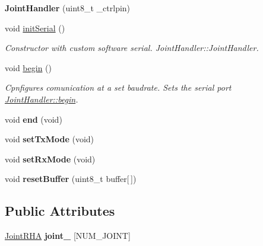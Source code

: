 \begin{DoxyCompactItemize}
\item 
{\bfseries Joint\+Handler} (uint8\+\_\+t \+\_\+ctrlpin)\hypertarget{classJointHandler_a0fee18580cac7d1204d85d8e68b0a9d7}{}\label{classJointHandler_a0fee18580cac7d1204d85d8e68b0a9d7}

\item 
void \hyperlink{classJointHandler_a07ae726dc11e63b114ce75cfb29c512e}{init\+Serial} ()
\begin{DoxyCompactList}\small\item\em Constructor with custom software serial.  Joint\+Handler\+::\+Joint\+Handler. \end{DoxyCompactList}\item 
void \hyperlink{classJointHandler_a7e9040e7d08d4aef28039bf9fa3489fc}{begin} ()
\begin{DoxyCompactList}\small\item\em Cpnfigures comunication at a set baudrate. Sets the serial port  \hyperlink{classJointHandler_a7e9040e7d08d4aef28039bf9fa3489fc}{Joint\+Handler\+::begin}. \end{DoxyCompactList}\item 
void {\bfseries end} (void)\hypertarget{classJointHandler_a3255e1808b7f1dde7e506b01c442e376}{}\label{classJointHandler_a3255e1808b7f1dde7e506b01c442e376}

\item 
void {\bfseries set\+Tx\+Mode} (void)\hypertarget{classJointHandler_a17bd9652b2c42fac0190347e962c134d}{}\label{classJointHandler_a17bd9652b2c42fac0190347e962c134d}

\item 
void {\bfseries set\+Rx\+Mode} (void)\hypertarget{classJointHandler_a3f78a794156c4e4bc42a5021158bc5f3}{}\label{classJointHandler_a3f78a794156c4e4bc42a5021158bc5f3}

\item 
void {\bfseries reset\+Buffer} (uint8\+\_\+t buffer\mbox{[}$\,$\mbox{]})\hypertarget{classJointHandler_ab0f0ab5f9af2865b07c0e61abac3b604}{}\label{classJointHandler_ab0f0ab5f9af2865b07c0e61abac3b604}

\end{DoxyCompactItemize}
\subsection*{Public Attributes}
\begin{DoxyCompactItemize}
\item 
\hyperlink{classJointRHA}{Joint\+R\+HA} {\bfseries joint\+\_\+} \mbox{[}N\+U\+M\+\_\+\+J\+O\+I\+NT\mbox{]}\hypertarget{classJointHandler_ad2dc857e0c3c93a54848ef43b653e9ab}{}\label{classJointHandler_ad2dc857e0c3c93a54848ef43b653e9ab}

\end{DoxyCompactItemize}


